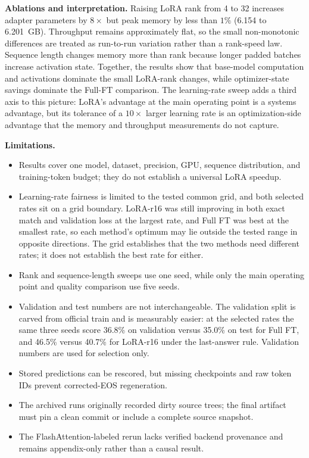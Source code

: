 \documentclass[10pt]{article}
\begin{document}
\textbf{Ablations and interpretation.} Raising LoRA rank from 4 to 32 increases adapter parameters by $8\times$ but peak memory by less than $1\%$ (6.154 to 6.201~GB). Throughput remains approximately flat, so the small non-monotonic differences are treated as run-to-run variation rather than a rank-speed law. Sequence length changes memory more than rank because longer padded batches increase activation state. Together, the results show that base-model computation and activations dominate the small LoRA-rank changes, while optimizer-state savings dominate the Full-FT comparison. The learning-rate sweep adds a third axis to this picture: LoRA's advantage at the main operating point is a systems advantage, but its tolerance of a $10\times$ larger learning rate is an optimization-side advantage that the memory and throughput measurements do not capture.

\textbf{Limitations.}
\begin{itemize}
    \item Results cover one model, dataset, precision, GPU, sequence distribution, and training-token budget; they do not establish a universal LoRA speedup.
    \item Learning-rate fairness is limited to the tested common grid, and both selected rates sit on a grid boundary. LoRA-r16 was still improving in both exact match and validation loss at the largest rate, and Full FT was best at the smallest rate, so each method's optimum may lie outside the tested range in opposite directions. The grid establishes that the two methods need different rates; it does not establish the best rate for either.
    \item Rank and sequence-length sweeps use one seed, while only the main operating point and quality comparison use five seeds.
    \item Validation and test numbers are not interchangeable. The validation split is carved from official train and is measurably easier: at the selected rates the same three seeds score 36.8\% on validation versus 35.0\% on test for Full FT, and 46.5\% versus 40.7\% for LoRA-r16 under the last-answer rule. Validation numbers are used for selection only.
    \item Stored predictions can be rescored, but missing checkpoints and raw token IDs prevent corrected-EOS regeneration.
    \item The archived runs originally recorded dirty source trees; the final artifact must pin a clean commit or include a complete source snapshot.
    \item The FlashAttention-labeled rerun lacks verified backend provenance and remains appendix-only rather than a causal result.
\end{itemize}
\end{document}
